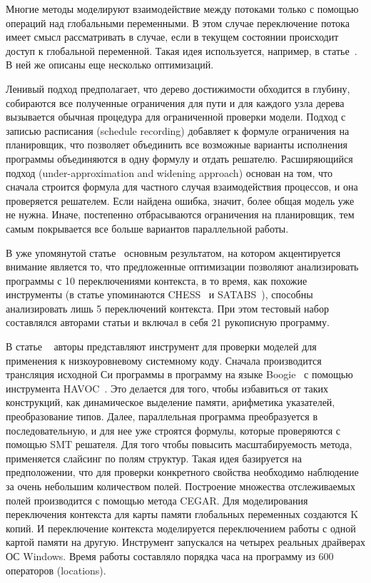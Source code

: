 Многие методы моделируют взаимодействие между потоками только с помощью операций над глобальными переменными.
В этом случае переключение потока имеет смысл рассматривать в случае, если в текущем состоянии происходит доступ к глобальной переменной.
Такая идея используется, например, в статье~\cite{Cordeiro:2011}. В ней же описаны еще несколько оптимизаций.

Ленивый подход предполагает, что дерево достижимости обходится в глубину, собираются все полученные ограничения для пути и для каждого узла дерева вызывается обычная процедура для ограниченной проверки модели.
Подход с записью расписания (schedule recording) добавляет к формуле ограничения на планировщик, что позволяет объединить все возможные варианты исполнения программы объединяются в одну формулу и отдать решателю.
Расширяющийся подход (under-approximation and widening approach) основан на том, что сначала строится формула для частного случая взаимодействия процессов, и она проверяется решателем.
Если найдена ошибка, значит, более общая модель уже не нужна. Иначе, постепенно отбрасываются ограничения на планировщик, тем самым покрывается все больше вариантов параллельной работы. 

В уже упомянутой статье~\cite{Cordeiro:2011} основным результатом, на котором акцентируется внимание является то, что предложенные оптимизации позволяют анализировать программы с 10 переключениями контекста, в то время, как похожие инструменты (в статье упоминаются CHESS~\cite{Musuvathi:2007} и SATABS~\cite{SATabs}), способны анализировать лишь 5 переключений контекста.
При этом тестовый набор составлялся авторами статьи и включал в себя 21 рукописную программу. 

В статье ~\cite{Lahiri:2009} авторы представляют инструмент для проверки моделей для применения к низкоуровневому системному коду.
Сначала производится трансляция исходной Си программы в программу на языке Boogie~\cite{boogiePL} с помощью инструмента HAVOC~\cite{Chatterjee:2007}.
Это делается для того, чтобы избавиться от таких конструкций, как динамическое выделение памяти, арифметика указателей, преобразование типов. Далее, параллельная программа преобразуется в последовательную, и для нее уже строятся формулы, которые проверяются с помощью SMT решателя.
Для того чтобы повысить масштабируемость метода, применяется слайсинг по полям структур.
Такая идея базируется на предположении, что для проверки конкретного свойства необходимо наблюдение за очень небольшим количеством полей.
Построение множества отслеживаемых полей производится с помощью метода CEGAR. 
Для моделирования переключения контекста для карты памяти глобальных переменных создаются K копий. И переключение контекста моделируется переключением работы с одной картой памяти на другую.
Инструмент запускался на четырех реальных драйверах ОС Windows.
Время работы составляло порядка часа на программу из 600 операторов (locations). 

